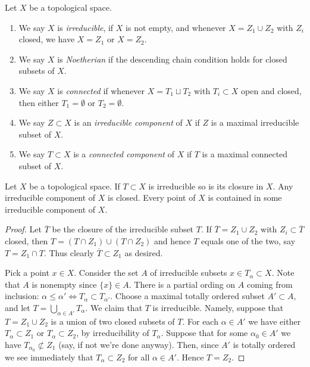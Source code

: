 \begin{definition}
Let $X$ be a topological space.
\begin{enumerate}
\item We say $X$ is {\it irreducible}, if $X$ is not empty, and whenever
$X = Z_1 \cup Z_2$ with $Z_i$ closed, we have $X = Z_1$ or $X = Z_2$.
\item We say $X$ is {\it Noetherian} if the descending chain condition
holds for closed subsets of $X$.
\item We say $X$ is {\it connected} if whenever $X = T_1 \sqcup T_2$
with $T_i \subset X$ open and closed, then either $T_1 = \emptyset$ or
$T_2 = \emptyset$.
\item We say $Z \subset X$ is an {\it irreducible component} of $X$
if $Z$ is a maximal irreducible subset of $X$.
\item We say $T \subset X$ is a {\it connected component} of $X$ if
$T$ is a maximal connected subset of $X$. 
\end{enumerate}
\end{definition}

\begin{lemma}
\label{lemma-irreducible}
Let $X$ be a topological space. If $T \subset X$ is irreducible
so is its closure in $X$. Any irreducible component of $X$ is
closed. Every point of $X$ is contained in some irreducible component
of $X$.
\end{lemma}

\begin{proof}
Let $\overline{T}$ be the closure of the irreducible subset $T$.
If $\overline{T} = Z_1 \cup Z_2$ with $Z_i \subset \overline{T}$
closed, then $T = (T\cap Z_1) \cup (T \cap Z_2)$ and hence 
$T$ equals one of the two, say $T = Z_1 \cap T$. Thus clearly
$\overline{T} \subset Z_1$ as desired.

\medskip\noindent
Pick a point $x\in X$. Consider the set $A$ of irreducible subsets
$x \in T_\alpha \subset X$. Note that $A$ is nonempty since
$\{x\} \in A$. There is a partial ording on $A$ coming from
inclusion: $\alpha \leq \alpha' \Leftrightarrow T_\alpha \subset T_{\alpha'}$.
Choose a maximal totally ordered subset $A' \subset A$, and let
$T = \bigcup_{\alpha \in A'} T_\alpha$. We claim that $T$ is 
irreducible. Namely, suppose that $T =  Z_1 \cup Z_2$ is a union
of two closed subsets of $T$. For each $\alpha \in A'$ we have
either $T_\alpha \subset Z_1$ or $T_\alpha \subset Z_2$, by irreducibility
of $T_\alpha$. Suppose that for some $\alpha_0 \in A'$ we have
$T_{\alpha_0} \not\subset Z_1$ (say, if not we're done anyway).
Then, since $A'$ is totally ordered we see immediately that
$T_\alpha \subset Z_2$ for all $\alpha \in A'$. Hence $T = Z_2$. 
\end{proof}

